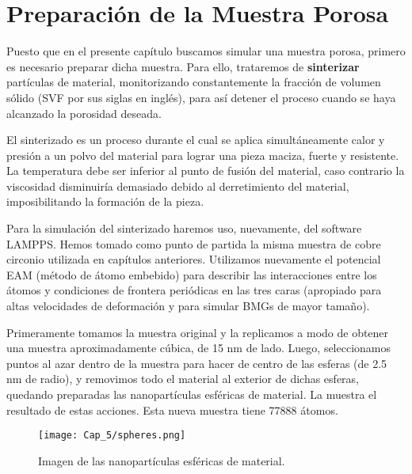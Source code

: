 
\section{Preparación de la Muestra Porosa}
\label{S5_3}

Puesto que en el presente capítulo buscamos simular una muestra porosa, primero es necesario preparar dicha muestra. Para ello,
trataremos de \textbf{sinterizar} partículas de material, monitorizando constantemente la fracción de volumen sólido (SVF
por sus siglas en inglés), para así detener el proceso cuando se haya alcanzado la porosidad deseada.

El sinterizado es un proceso durante el cual se aplica simultáneamente calor y presión a un polvo
del material para lograr una pieza maciza, fuerte y resistente. La temperatura debe ser inferior al punto de fusión del material,
caso contrario la viscosidad disminuiría demasiado debido al derretimiento del material, imposibilitando la formación de la pieza.

Para la simulación del sinterizado haremos uso, nuevamente, del software LAMPPS. Hemos tomado como punto de partida la misma muestra
de cobre circonio utilizada en capítulos anteriores. Utilizamos nuevamente el potencial EAM (método de átomo embebido) \citep{daw84}
para describir las interacciones entre los átomos y condiciones de frontera periódicas en las tres caras (apropiado para altas velocidades
de deformación \citep{bringa05} y para simular BMGs de mayor tamaño).

Primeramente tomamos la muestra original y la replicamos a modo de obtener una muestra aproximadamente cúbica, de 15 nm de lado. 
Luego, seleccionamos puntos
al azar dentro de la muestra para hacer de centro de las esferas (de 2.5 nm de radio), y removimos todo el material al exterior de dichas esferas,
quedando preparadas las nanopartículas esféricas de material. La  muestra el resultado de estas
acciones. Esta nueva muestra tiene 77888 átomos.

\begin{figure}[h!]
  \centering
  \texttt{[image: Cap\_5/spheres.png]}
  \caption[Nanopartículas esféricas de material]{Imagen de las nanopartículas esféricas de material.}
  \label{C5:fg:sintInicial}
\end{figure}


